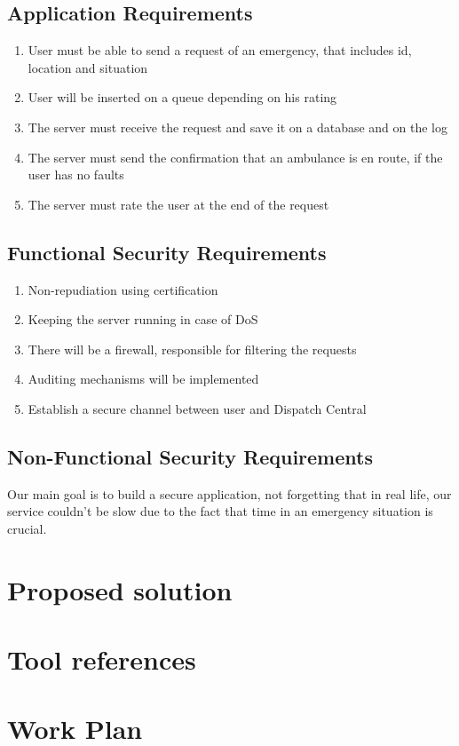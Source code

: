 \documentclass[a4paper,titlepage,11pt]{article}
\begin{document}
	\subsection{Application Requirements}
		\begin{enumerate}
			\item User must be able to send a request of an emergency, that includes id, location and situation

			\item User will be inserted on a queue depending on his rating
			
			\item The server must receive the request and save it on a database and on the log

			\item The server must send the confirmation that an ambulance is en route, if the user has no faults 

			\item The server must rate the user at the end of the request
			
 
		\end{enumerate}

	\subsection{Functional Security Requirements}
		\begin{enumerate}
			\item Non-repudiation using certification
			
			\item Keeping the server running in case of DoS
			
			\item There will be a firewall, responsible for filtering the requests

			\item Auditing mechanisms will be implemented

			\item Establish a secure channel between user and Dispatch Central

		\end{enumerate}
	\subsection{Non-Functional Security Requirements}
			Our main goal is to build a secure application, not forgetting that in real life, our service couldn't be slow due to the fact that time in an emergency situation is crucial.


\section{Proposed solution}

\section{Tool references}

\section{Work Plan}
\end{document}
